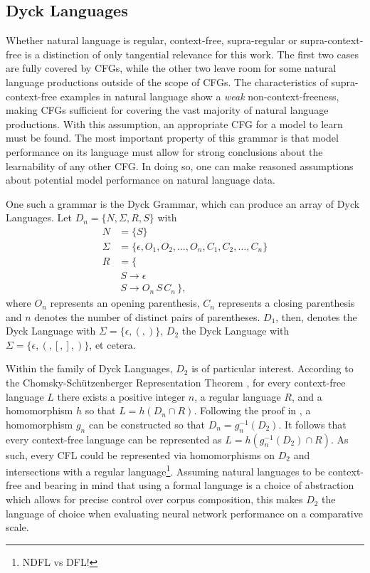 \subsection{Dyck Languages}\label{dyckLanguages}
Whether natural language is regular, context-free, supra-regular or supra-context-free is a distinction of only tangential relevance for this work. The first two cases are fully covered by CFGs, while the other two leave room for some natural language productions outside of the scope of CFGs. The characteristics of supra-context-free examples in natural language show a \textit{weak} non-context-freeness, making CFGs sufficient for covering the vast majority of natural language productions. With this assumption, an appropriate CFG for a model to learn must be found. The most important property of this grammar is that model performance on its language must allow for strong conclusions about the learnability of any other CFG. In doing so, one can make reasoned assumptions about potential model performance on natural language data. 

One such a grammar is the Dyck Grammar, which can produce an array of Dyck Languages. Let $D_{n} = \lbrace N, \Sigma, R, S \rbrace$ with
\begin{align*}
	N &= \lbrace S \rbrace \\
	\Sigma &= \lbrace \epsilon, O_{1}, O_{2}, \dots, O_{n}, C_{1}, C_{2}, \dots, C_{n} \rbrace \\
	R &= \lbrace \\
		 & \: S \rightarrow \epsilon \\
		 & \: S \rightarrow O_{n} \, S \, C_{n} \, \rbrace ,
\end{align*}
where $O_{n}$ represents an opening parenthesis, $C_{n}$ represents a closing parenthesis and $n$ denotes the number of distinct pairs of parentheses. $D_1$, then, denotes the Dyck Language with $\Sigma = \lbrace \epsilon, (, ) \rbrace$, $D_2$ the Dyck Language with $\Sigma = \lbrace \epsilon, (, [, ], ) \rbrace$, et cetera.

Within the family of Dyck Languages, $D_2$ is of particular interest. According to the Chomsky-Schützenberger Representation Theorem \citep{Chomsky1963}, for every context-free language $L$ there exists a positive integer $n$, a regular language $R$, and a homomorphism $h$ so that $L = h(D_{n} \cap R)$. Following the proof in \cite{Autebert1997}, a homomorphism $g_{n}$ can be constructed so that $D_{n} = g_{n}^{-1}(D_{2})$. It follows that every context-free language can be represented as $L = h(g_{n}^{-1}(D_{2}) \cap R)$. As such, every CFL could be represented via homomorphisms on $D_2$ and intersections with a regular language\footnote{NDFL vs DFL!}. Assuming natural languages to be context-free and bearing in mind that using a formal language is a choice of abstraction which allows for precise control over corpus composition, this makes $D_2$ the language of choice when evaluating neural network performance on a comparative scale.

